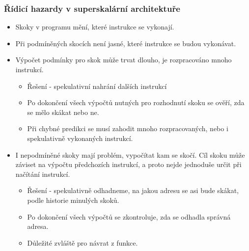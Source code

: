 \documentclass{beamer}
\begin{document}
\begin{frame}
\frametitle{Řídicí hazardy v superskalární architektuře}

\begin{itemize}
\item Skoky v programu mění, které instrukce se vykonají.
\item Při podmíněných skocích není jasné, které instrukce se budou vykonávat.
\item Výpočet podmínky pro skok může trvat dlouho, je rozpracováno mnoho instrukcí.
\begin{itemize}
\item Řešení - spekulativní nahrání dalších instrukcí
\item Po dokončení všech výpočtů nutných pro rozhodnutí skoku se ověří, zda se mělo skákat nebo ne.
\item Při chybné predikci se musí zahodit mnoho rozpracovaných, nebo i spekulativně vykonaných instrukcí.
\end{itemize}
\item I nepodmíněné skoky mají problém, vypočítat kam se skočí. Cíl skoku může záviset na výpočtu předchozích instrukcí, a proto nejde jednoduše určit při načítání instrukcí.
\begin{itemize}
\item Řešení - spekulativně odhadneme, na jakou adresu se asi bude skákat, podle historie minulých skoků.
\item Po dokončení všech výpočtů se zkontroluje, zda se odhadla správná adresa.
\item Důležité zvláště pro návrat z funkce.
\end{itemize}
\end{itemize}

\end{frame}
\end{document}
